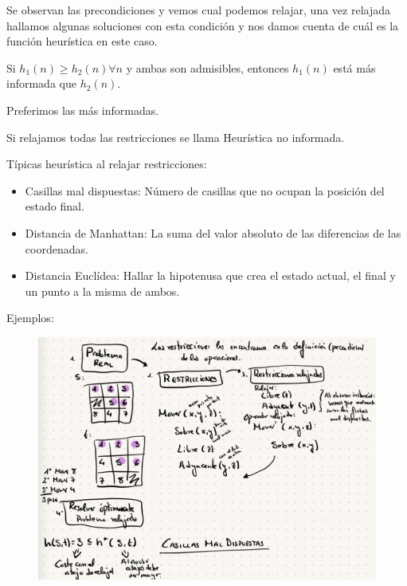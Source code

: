 \documentclass[12pt, twoside, openright]{report} %
\begin{document}
	Se observan las precondiciones y vemos cual podemos relajar, una vez
    relajada hallamos algunas soluciones con esta condición y nos damos
    cuenta de cuál es la función heurística en este caso.

	Si \(h_1(n)\geq h_2(n) \forall n\) y ambas son admisibles, entonces
    \(h_1(n)\) está más informada que \(h_2(n)\).

    Preferimos las más informadas.

	Si relajamos todas las restricciones se llama Heurística no
    informada.

	Típicas heurística al relajar restricciones:

    \begin{itemize}
  
    \item
      Casillas mal dispuestas: Número de casillas que no ocupan la
      posición del estado final.
    \item
      Distancia de Manhattan: La suma del valor absoluto de las
      diferencias de las coordenadas.
    \item
      Distancia Euclídea: Hallar la hipotenusa que crea el estado
      actual, el final y un punto a la misma de ambos.
    \end{itemize}
\pagebreak
	Ejemplos:
	\begin{figure}[H]
		{\includegraphics[scale=.22]{Untitled 52.png}}
	\end{figure}
\end{document}
